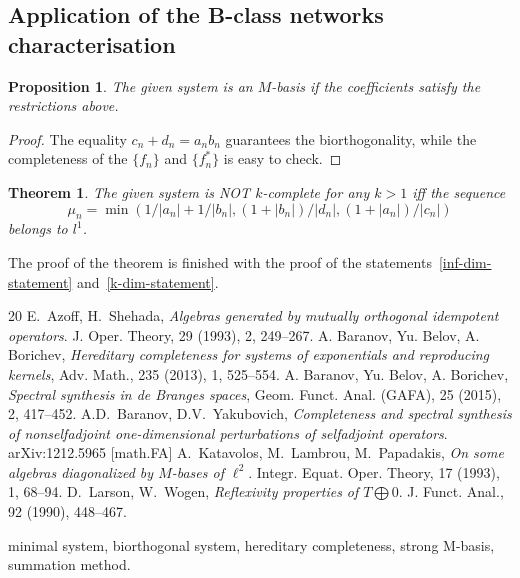 \documentclass[12pt]{article}
\newtheorem{theorem}{Theorem}
\newtheorem{prop}{Proposition}
\theoremstyle{definition}
\numberwithin{remark}{section}
\numberwithin{theorem}{section}
\numberwithin{prop}{section}
\numberwithin{equation}{section}
\numberwithin{lemma}{section}
\numberwithin{prop_under_lemma}{lemma}
\begin{document}
    \subsection{Application of the B-class networks characterisation}
    \pagebreak
    \begin{prop}
        The given system is an $M$-basis if the coefficients satisfy the restrictions above.
    \end{prop}
    \begin{proof}
        The equality $c_n + d_n = a_n b_n$ guarantees the bi\-orthogonality,
        while the completeness of the $\{f_n\}$ and $\{f_n^*\}$ is
        easy to check.
    \end{proof}
    
    \begin{theorem}
        The given system is NOT $k$-complete for any $k > 1$ iff the sequence
        $$
            \mu_n = \min(1/|a_n| + 1/|b_n|, (1 + |b_n|)/|d_n|, (1 + |a_n|)/|c_n|)
        $$ belongs to $l^1$.
    \end{theorem}
        The proof of the theorem is finished with the proof of the statements~\ref{inf-dim-statement} and~\ref{k-dim-statement}.
\medskip
\bigskip
\begin {thebibliography}{20}
    E.~\!Azoff, H.~\!Shehada,
    \emph{Algebras generated by mutually orthogonal idempotent operators}.
    J. Oper. Theory, 29 (1993), 2, 249--267.
    A. Baranov, Yu. Belov, A. Borichev,
    \emph{Hereditary completeness for systems of exponentials and reproducing kernels},
    Adv. Math., 235 (2013), 1, 525--554.
    A. Baranov, Yu. Belov, A. Borichev, 
    \emph{Spectral synthesis in de Branges spaces},
    Geom. Funct. Anal. (GAFA), 25 (2015), 2, 417--452.
    A.D.~\!Baranov, D.V.~\!Yakubovich,
    \emph{Completeness and spectral synthesis of nonselfadjoint one-dimensional
    perturbations of selfadjoint operators}.
    arXiv:1212.5965 [math.FA]
    A.~\!Katavolos, M.~\!Lambrou, M.~\!Papadakis,
    \emph{On some algebras diagonalized by $M$-bases of $\ell^2$}.
    Integr. Equat. Oper. Theory, 17 (1993), 1, 68--94.
    D.~\!Larson, W.~\!Wogen,
    \emph{Reflexivity properties of $T\bigoplus0$}.
    J. Funct. Anal., 92 (1990), 448--467.

\end{thebibliography}
\vspace{1em}
 minimal system, biorthogonal system, hereditary completeness, strong M-basis, summation method.
\end{document}
